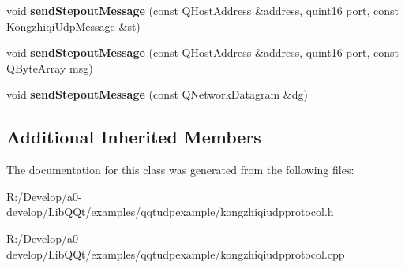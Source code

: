 \begin{DoxyCompactItemize}
\item 
\mbox{\label{class_kongzhiqi_udp_protocol_a36b0210c653e8acf24872432ae48a8a6}} 
void {\bfseries send\+Stepout\+Message} (const Q\+Host\+Address \&address, quint16 port, const \mbox{\hyperlink{class_kongzhiqi_udp_message}{Kongzhiqi\+Udp\+Message}} \&st)
\item 
\mbox{\label{class_kongzhiqi_udp_protocol_a88b57838cb9ccb3a18548319f841de32}} 
void {\bfseries send\+Stepout\+Message} (const Q\+Host\+Address \&address, quint16 port, const Q\+Byte\+Array msg)
\item 
\mbox{\label{class_kongzhiqi_udp_protocol_a7e3df107b29fff6ae4db5762b49908c9}} 
void {\bfseries send\+Stepout\+Message} (const Q\+Network\+Datagram \&dg)
\end{DoxyCompactItemize}
\subsection*{Additional Inherited Members}


The documentation for this class was generated from the following files\+:\begin{DoxyCompactItemize}
\item 
R\+:/\+Develop/a0-\/develop/\+Lib\+Q\+Qt/examples/qqtudpexample/kongzhiqiudpprotocol.\+h\item 
R\+:/\+Develop/a0-\/develop/\+Lib\+Q\+Qt/examples/qqtudpexample/kongzhiqiudpprotocol.\+cpp\end{DoxyCompactItemize}

